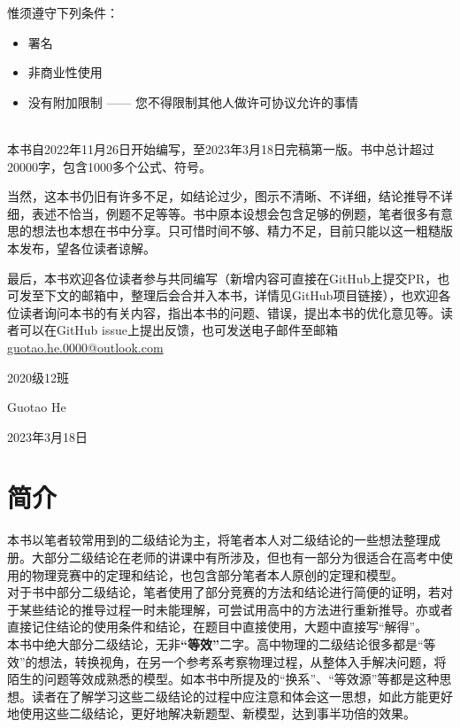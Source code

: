\documentclass{gbook}
\begin{document}
惟须遵守下列条件：
\begin{itemize}
    \item 署名
    \item 非商业性使用
    \item 没有附加限制 —— 您不得限制其他人做许可协议允许的事情
\end{itemize}
~\\

本书自2022年11月26日开始编写，至2023年3月18日完稿第一版。书中总计超过20000字，包含1000多个公式、符号。

当然，这本书仍旧有许多不足，如结论过少，图示不清晰、不详细，结论推导不详细，表述不恰当，例题不足等等。书中原本设想会包含足够的例题，笔者很多有意思的想法也本想在书中分享。只可惜时间不够、精力不足，目前只能以这一粗糙版本发布，望各位读者谅解。

最后，本书欢迎各位读者参与共同编写（新增内容可直接在GitHub上提交PR，也可发至下文的邮箱中，整理后会合并入本书，详情见GitHub项目链接），也欢迎各位读者询问本书的有关内容，指出本书的问题、错误，提出本书的优化意见等。读者可以在GitHub issue上提出反馈，也可发送电子邮件至邮箱\url{guotao.he.0000@outlook.com}
~\\

\begin{flushright}
2020级12班

Guotao He

2023年3月18日
\end{flushright}
\newpage

\section*{简介}


本书以笔者较常用到的二级结论为主，将笔者本人对二级结论的一些想法整理成册。大部分二级结论在老师的讲课中有所涉及，但也有一部分为很适合在高考中使用的物理竞赛中的定理和结论，也包含部分笔者本人原创的定理和模型。
~\\

对于书中部分二级结论，笔者使用了部分竞赛的方法和结论进行简便的证明，若对于某些结论的推导过程一时未能理解，可尝试用高中的方法进行重新推导。亦或者直接记住结论的使用条件和结论，在题目中直接使用，大题中直接写“解得”。
~\\

本书中绝大部分二级结论，无非\textbf{“等效”}二字。高中物理的二级结论很多都是“等效”的想法，转换视角，在另一个参考系考察物理过程，从整体入手解决问题，将陌生的问题等效成熟悉的模型。如本书中所提及的“换系”、“等效源”等都是这种思想。读者在了解学习这些二级结论的过程中应注意和体会这一思想，如此方能更好地使用这些二级结论，更好地解决新题型、新模型，达到事半功倍的效果。
~\\
\end{document}
